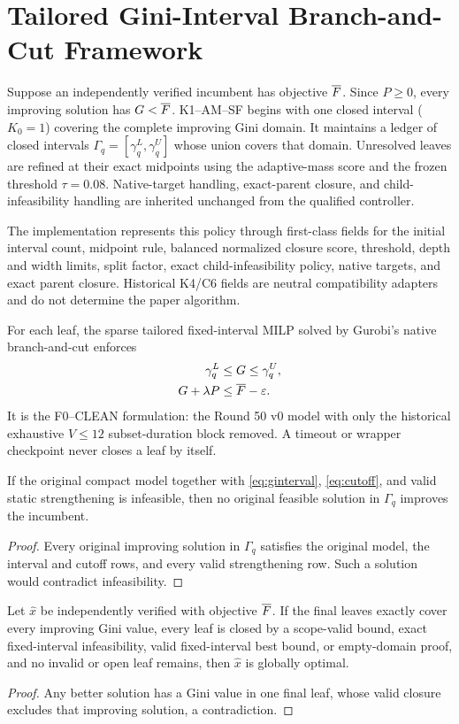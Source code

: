 \section{Tailored Gini-Interval Branch-and-Cut Framework}
Suppose an independently verified incumbent has objective $\overline F$. Since
$P\geq0$, every improving solution has $G<\overline F$. K1--AM--SF begins with one
closed interval ($K_0=1$) covering the complete improving Gini domain. It
maintains a ledger of closed intervals $\Gamma_q=[\gamma_q^L,\gamma_q^U]$
whose union covers that domain. Unresolved leaves are refined at their exact
midpoints using the adaptive-mass score and the frozen threshold
$\tau=0.08$. Native-target handling, exact-parent closure, and
child-infeasibility handling are inherited unchanged from the qualified
controller.

The implementation represents this policy through first-class fields for the
initial interval count, midpoint rule, balanced normalized closure score,
threshold, depth and width limits, split factor, exact child-infeasibility
policy, native targets, and exact parent closure. Historical K4/C6 fields are
neutral compatibility adapters and do not determine the paper algorithm.

For each leaf, the sparse tailored fixed-interval MILP solved by Gurobi's
native branch-and-cut enforces
\begin{align}
 \gamma_q^L &\leq G\leq\gamma_q^U,\label{eq:ginterval}\\
 G+\lambda P &\leq \overline F-\varepsilon.\label{eq:cutoff}
\end{align}
It is the F0--CLEAN formulation: the Round 50 v0 model with only the
historical exhaustive $V\leq12$ subset-duration block removed. A timeout or
wrapper checkpoint never closes a leaf by itself.

\begin{proposition}
If the original compact model together with \eqref{eq:ginterval},
\eqref{eq:cutoff}, and valid static strengthening is infeasible, then no
original feasible solution in $\Gamma_q$ improves the incumbent.
\end{proposition}
\begin{proof}
Every original improving solution in $\Gamma_q$ satisfies the original model,
the interval and cutoff rows, and every valid strengthening row. Such a
solution would contradict infeasibility.
\end{proof}

\begin{theorem}
Let $\widehat x$ be independently verified with objective $\overline F$. If the
final leaves exactly cover every improving Gini value, every leaf is closed by
a scope-valid bound, exact fixed-interval infeasibility, valid fixed-interval
best bound, or empty-domain proof, and no invalid or open leaf remains, then
$\widehat x$ is globally optimal.
\end{theorem}
\begin{proof}
Any better solution has a Gini value in one final leaf, whose valid closure
excludes that improving solution, a contradiction.
\end{proof}

